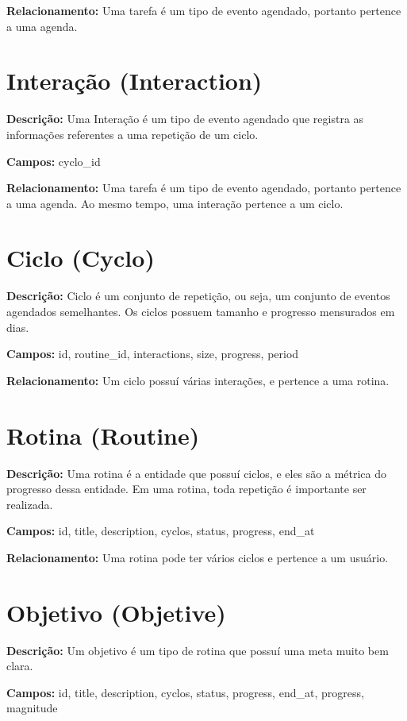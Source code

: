\textbf{Relacionamento:} Uma tarefa é um tipo de evento agendado, portanto pertence a uma agenda.

\section{Interação (Interaction)}

\textbf{Descrição:} Uma Interação é um tipo de evento agendado que registra as informações referentes a uma repetição de um ciclo.

\textbf{Campos:} cyclo\_id

\textbf{Relacionamento:} Uma tarefa é um tipo de evento agendado, portanto pertence a uma agenda. Ao mesmo tempo, uma interação pertence a um ciclo.

\section{Ciclo (Cyclo)}

\textbf{Descrição:} Ciclo é um conjunto de repetição, ou seja, um conjunto de eventos agendados semelhantes. Os ciclos possuem tamanho e progresso mensurados em dias.

\textbf{Campos:} id, routine\_id, interactions, size, progress, period

\textbf{Relacionamento:} Um ciclo possuí várias interações, e pertence a uma rotina.

\section{Rotina (Routine)}

\textbf{Descrição:} Uma rotina é a entidade que possuí ciclos, e eles são a métrica do progresso dessa entidade. Em uma rotina, toda repetição é importante ser realizada.

\textbf{Campos:} id, title, description, cyclos, status, progress, end\_at

\textbf{Relacionamento:} Uma rotina pode ter vários ciclos e pertence a um usuário.

\section{Objetivo (Objetive)}

\textbf{Descrição:} Um objetivo é um tipo de rotina que possuí uma meta muito bem clara.

\textbf{Campos:} id, title, description, cyclos, status, progress, end\_at, progress, magnitude

